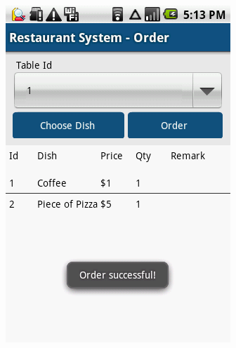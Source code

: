 \begin{enumerate}
\begin{figure}[h!t]
{\begin{subfigure}[b]{.33\textwidth}
{  \includegraphics[width=0.9\linewidth]{ch2/RelatedApps/RestaurantSystem/2.png}
  }
\end{subfigure}
\begin{subfigure}[b]{.33\textwidth}
  \centering
  \fbox{
}
\end{subfigure}}
\end{figure}
\end{enumerate}

